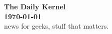 \documentclass[a4paper,11pt]{article}
\begin{document}
\begin{center}


{\Huge \textbf{The Daily Kernel}}\\
{\large \textbf{\today}}\\
{news for geeks, stuff that matters.}\\

\begin{tabular}{c} \hspace{13cm} \\ \hline \end{tabular}

\vspace*{0.5cm}


\end{center}
\end{document}
